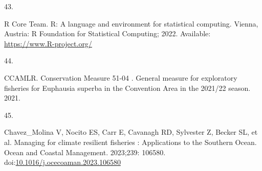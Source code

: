 \documentclass[
]{article}
\newlength{\cslhangindent}
\newlength{\csllabelwidth}
\newlength{\cslentryspacingunit} %
\newenvironment{CSLReferences}[2] %
 {%
  \setlength{\parindent}{0pt}
  \ifodd #1
  \let\oldpar\par
  \def\par{\hangindent=\cslhangindent\oldpar}
  \fi
  \setlength{\parskip}{#2\cslentryspacingunit}
 }%
 {}
\newcommand{\CSLLeftMargin}[1]{\parbox[t]{\csllabelwidth}{#1}}
\newcommand{\CSLRightInline}[1]{\parbox[t]{\linewidth - \csllabelwidth}{#1}\break}
\begin{document}
\begin{CSLReferences}{0}{0}
\leavevmode{}%
\CSLLeftMargin{43. }%
\CSLRightInline{R Core Team. R: A language and environment for
statistical computing. Vienna, Austria: R Foundation for Statistical
Computing; 2022. Available: \url{https://www.R-project.org/}}

\leavevmode{}%
\CSLLeftMargin{44. }%
\CSLRightInline{CCAMLR. {Conservation Measure 51-04 . General measure
for exploratory fisheries for Euphausia superba in the Convention Area
in the 2021/22 season}. 2021. }

\leavevmode{}%
\CSLLeftMargin{45. }%
\CSLRightInline{Chavez\_Molina V, Nocito ES, Carr E, Cavanagh RD,
Sylvester Z, Becker SL, et al. {Managing for climate resilient fisheries
: Applications to the Southern Ocean}. Ocean and Coastal Management.
2023;239: 106580.
doi:\href{https://doi.org/10.1016/j.ocecoaman.2023.106580}{10.1016/j.ocecoaman.2023.106580}}

\end{CSLReferences}
\end{document}
